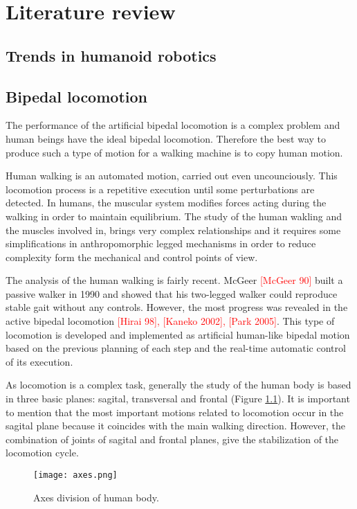 \chapter{Literature review}
\section{Trends in humanoid robotics}


\section{Bipedal locomotion}
The performance of the artificial bipedal locomotion is a complex problem and human beings have the ideal bipedal locomotion. Therefore the best way to produce such a type of motion for a walking machine is to copy human motion.

Human walking is an automated motion, carried out even uncounciously. This locomotion process is a repetitive execution until some perturbations are detected. In humans, the muscular system modifies forces acting during the walking in order to maintain equilibrium. The study of the human wakling and the muscles involved in, brings very complex relationships and it requires some simplifications in anthropomorphic legged mechanisms in order to reduce complexity form the mechanical and control points of view.

The analysis of the human walking is fairly recent. McGeer \textcolor{red}{[McGeer 90]} built a passive walker in 1990 and showed that his two-legged walker could reproduce stable gait without any controls. However, the most progress was revealed in the active bipedal locomotion \textcolor{red}{[Hirai 98], [Kaneko 2002], [Park 2005]}. This type of locomotion is developed and implemented as artificial human-like bipedal motion based on the previous planning of each step and the real-time automatic control of its execution. 

As locomotion is a complex task, generally the study of the human body is based in three basic planes: sagital, transversal and frontal (Figure \ref{fig:axes}). It is important to mention that the most important motions related to locomotion occur in the sagital plane because it coincides with the main walking direction. However, the combination of joints of sagital and frontal planes, give the stabilization of the locomotion cycle.

\begin{figure}[!h]
\centering
\texttt{[image: axes.png]}
\caption{Axes division of human body.}
\label{fig:axes}
\end{figure}


